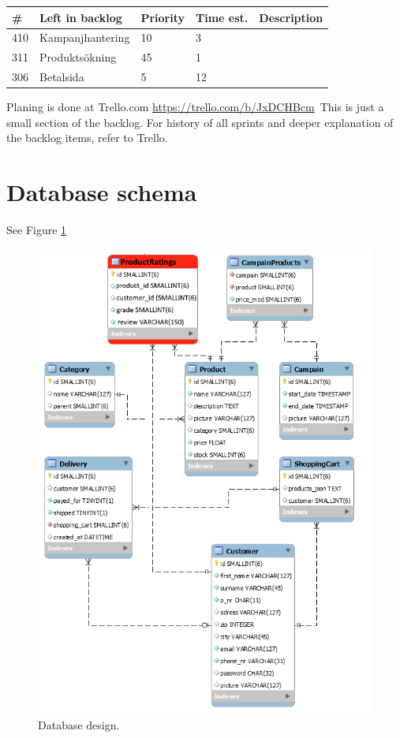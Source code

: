 \documentclass[paper=a4, fontsize=11pt]{report} %
\begin{document}
\begin{itemize}
	\begin{tabular}{|l|l|l|l|l|}
		\hline
		\#  & Left in backlog  & Priority & Time est. & Description \\ \hline
		410 & Kampanjhantering & 10       & 3         &             \\ \hline
		311 & Produktsökning   & 45       & 1         &             \\ \hline
		306 & Betalsida        & 5        & 12        &             \\ \hline
	\end{tabular}


	Planing is done at Trello.com
	\url{https://trello.com/b/JxDCHBcm}\
	This is just a small section of the backlog. For history of all sprints and deeper
	explanation of the backlog items, refer to Trello.

\section*{Database schema}
See Figure \ref{fig:6}
\begin{figure}
	\includegraphics[scale=0.7]{artifacts/db_implemented_1_3.png}
	\caption{Database design.}
	\label{fig:6}
\end{figure}


\end{itemize}
\end{document}
